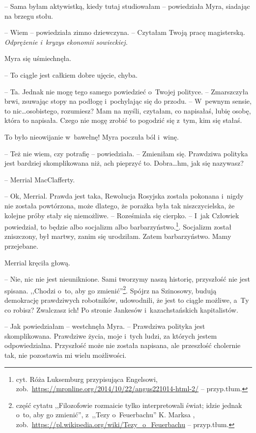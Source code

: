\documentclass[oneside,polish,11pt,sfheadings]{mwbk}
\begin{document}
-- Sama byłam aktywistką, kiedy tutaj studiowałam -- powiedziała Myra,
siadając na brzegu stołu.

-- Wiem -- powiedziała zimno dziewczyna. -- Czytałam Twoją pracę
magisterską. \textit{Odprężenie i~kryzys ekonomii sowieckiej.}

Myra się uśmiechnęła. 

-- To ciągle jest całkiem dobre ujęcie, chyba.

-- Ta. Jednak nie mogę tego samego powiedzieć o~Twojej polityce. -- Zmarszczyła brwi, zsuwając stopy na podłogę i~pochylając się do przodu.
-- W~pewnym sensie, to nic\ldots osobistego, rozumiesz? Mam na myśli,
czytałam, co napisałaś, lubię osobę, która to napisała. Czego nie mogę
zrobić to pogodzić się z~tym, kim się stałaś.

To było nieowijanie w~bawełnę! Myra poczuła ból i~winę.

-- Też nie wiem, czy potrafię -- powiedziała. -- Zmieniłam się. Prawdziwa
polityka jest bardziej skomplikowana niż, ach pieprzyć to. Dobra\ldots hm,
jak się nazywasz?

-- Merrial MacClafferty.

-- Ok, Merrial. Prawda jest taka, Rewolucja Rosyjska została pokonana i~nigdy nie została powtórzona, może dlatego, że porażka była tak
niszczycielska, że kolejne próby stały się niemożliwe. -- Roześmiała się
cierpko. -- I~jak Człowiek powiedział, to będzie albo socjalizm albo
barbarzyństwo.\footnote{ cyt. Róża Luksemburg przypisująca Engelsowi,
zob.~\url{https://mronline.org/2014/10/22/angus221014-html-2/}
-- przyp.tłum.}. Socjalizm został zniszczony, był martwy, zanim się
urodziłam. Zatem barbarzyństwo. Mamy przejebane.

Merrial kręciła głową. 

-- Nie, nic nie jest nieuniknione. Sami tworzymy
naszą historię, przyszłość nie jest spisana. ,,Chodzi o~to, aby go
zmienić''\footnote{ część cytatu ,,Filozofowie rozmaicie tylko interpretowali
świat; idzie jednak o~to, aby go zmienić'', z~,,Tezy o~Feuerbachu'' K.
Marksa ,
zob.~\url{https://pl.wikipedia.org/wiki/Tezy\_o\_Feuerbachu} --
przyp.tłum.}. Spójrz na Szinosowy, budują demokrację prawdziwych
robotników, udowodnili, że jest to ciągle możliwe, a~Ty co robisz?
Zwalczasz ich! Po stronie Jankesów i~kazachstańskich kapitalistów.

-- Jak powiedziałam -- westchnęła Myra. -- Prawdziwa polityka jest
skomplikowana. Prawdziwe życia, moje i~tych ludzi, za których jestem
odpowiedzialna. Przyszłość może nie została napisana, ale przeszłość
cholernie tak, nie pozostawia mi wielu możliwości.
\end{document}
